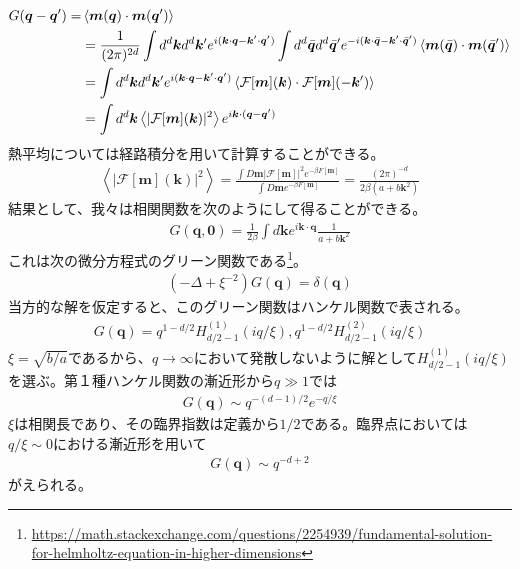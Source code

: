 \documentclass[autodetect-engine,dvipdfmx-if-dvi,ja=standard]{bxjsarticle}
\theoremstyle{break}
\begin{document}
                \fi
                \begin{align}
                    G(\bm{q}-\bm{q}')=&\braket{\bm{m}(\bm{q})\cdot \bm{m}(\bm{q}')}\\
                    &=\frac{1}{(2\pi)^{2d}}\int d^d \bm{k}d^d \bm{k}' e^{i(\bm{k}\cdot\bm{q}-\bm{k}'\cdot\bm{q}')}\int d^d \bar{\bm{q}}d^d \bar{\bm{q}}'e^{-i(\bm{k}\cdot\bar{\bm{q}}-\bm{k}'\cdot\bar{\bm{q}}')}\braket{\bm{m}(\bar{\bm{q}})\cdot \bm{m}(\bar{\bm{q}}')}\\
                    &=\int d^d \bm{k}d^d \bm{k}' e^{i(\bm{k}\cdot\bm{q}-\bm{k}'\cdot\bm{q}')}\braket{\mathcal{F}[\bm{m}]({\bm{k}})\cdot \mathcal{F}[\bm{m}](-\bm{k}')}\label{2-susy}\\
                    &=\int d^d\bm{k}\left\langle|\mathcal{F}[\bm{m}](\bm{k})|^2 \right\rangle e^{i\bm{k}\cdot (\bm{q}-\bm{q}')}\label{2-kuitai}
                \end{align}
                熱平均については経路積分を用いて計算することができる。
                \begin{align}
                    \left\langle|\mathcal{F}[\bm{m}](\bm{k})|^2 \right\rangle=\frac{\int D \bm{m}|\mathcal{F}[\bm{m}]|^2 e^{-\beta F[\bm{m}]}}{\int D \bm{m} e^{-\beta F[\bm{m}]}}=\frac{(2\pi)^{-d}}{2\beta (a+b\bm{k}^2)}
                \end{align}
                結果として、我々は相関関数を次のようにして得ることができる。
                \begin{align}
                    G(\bm{q},\bm{0})=\frac{1}{2\beta }\int d\bm{k}e^{i\bm{k}\cdot\bm{q}}\frac{1}{a+b\bm{k}^2}
                \end{align}
                これは次の微分方程式のグリーン関数である\footnote{\url{https://math.stackexchange.com/questions/2254939/fundamental-solution-for-helmholtz-equation-in-higher-dimensions}}。
                \begin{align}
                    (-\Delta +\xi^{-2} )G(\bm{q})=\delta (\bm{q})
                \end{align}
                当方的な解を仮定すると、このグリーン関数はハンケル関数で表される。
                \begin{align}
                    G(\bm{q})=q^{1-d/2}H^{(1)}_{d/2 -1}(iq/\xi),q^{1-d/2}H^{(2)}_{d/2 -1}(iq/\xi)
                \end{align}
                $\xi=\sqrt{b/a}$であるから、$q\to \infty$において発散しないように解として$H^{(1)}_{d/2 -1}(iq/\xi)$を選ぶ。第１種ハンケル関数の漸近形から$q\gg 1$では
                \begin{align}
                    G(\bm{q})\sim q^{-(d-1)/2}e^{-q/\xi}
                \end{align}
                $\xi$は相関長であり、その臨界指数は定義から$1/2$である。臨界点においては$q/\xi\sim 0$における漸近形を用いて
                \begin{align}
                    G(\bm{q})\sim q^{-d+2}
                \end{align}
                がえられる。
\end{document}
